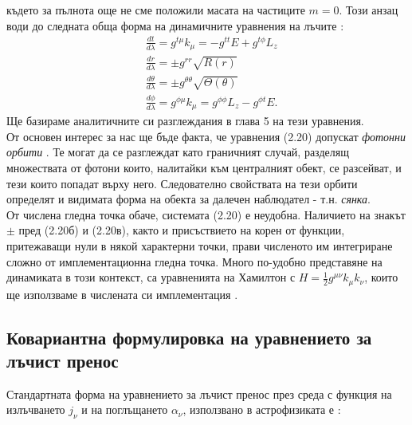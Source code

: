 \noindent където за пълнота още не сме положили масата на частиците $m = 0$. Този анзац води до следната обща форма на динамичните уравнения на лъчите \cite{Chandrasekhar}\cite{Wang2019}\cite{Gyulchev2018}:
\begin{subequations}
	\begin{align}
		&\frac{dt}{d\lambda} = g^{t\mu}k_\mu = -g^{tt}E + g^{t\phi}L_z\\
		&\frac{dr}{d\lambda} = \pm g^{rr}\sqrt{R(r)}\\
		&\frac{d\theta}{d\lambda} = \pm g^{\theta\theta}\sqrt{\Theta(\theta)}\\
		&\frac{d\phi}{d\lambda} = g^{\phi\mu}k_\mu = g^{\phi\phi}L_z - g^{\phi t}E.
	\end{align}
\end{subequations}
Ще базираме аналитичните си разглеждания в глава 5 на тези уравнения.\\

От основен интерес за нас ще бъде факта, че уравнения (2.20) допускат \emph{фотонни орбити} \cite{Teo}. Те могат да се разглеждат като граничният случай, разделящ множествата от фотони които, налитайки към централният обект, се разсейват, и тези които попадат върху него. Следователно свойствата на тези орбити определят и видимата форма на обекта за далечен наблюдател - т.н. \emph{сянка}.\\

От числена гледна точка обаче, системата (2.20) е неудобна. Наличието на знакът $\pm$ пред (2.20б) и (2.20в), както и присъствието на корен от функции, притежаващи нули в някой характерни точки, прави численото им интегриране сложно от имплементационна гледна точка. Много по-удобно представяне на динамиката в този контекст, са уравненията на Хамилтон с $H = \frac{1}{2}g^{\mu\nu}k_\mu k_\nu$, които ще използваме в числената си имплементация \cite{James_2015}.

\subsection{Ковариантна формулировка на уравнението за лъчист пренос}

Стандартната форма на уравнението за лъчист пренос през среда с функция на излъчването $j_\nu$ и на поглъщането $\alpha_\nu$, използвано в астрофизиката е \cite{Rad_processes}:

